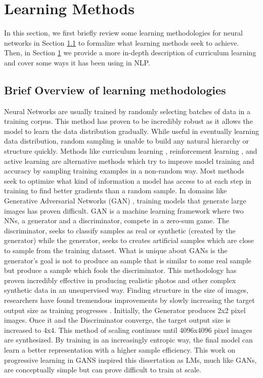 \section{Learning Methods}
\label{chap:prior:sec:cl}
In this section, we first briefly review some learning methodologies for neural networks in Section \ref{chap:prior:sec:cl:overview} to formalize what learning methods seek to achieve. Then, in Section \ref{chap:prior:sec:cl} we provide a more in-depth description of curriculum learning and cover some ways it has been using in NLP. 
\subsection{Brief Overview of learning methodologies}
\label{chap:prior:sec:cl:overview}
Neural Networks are usually trained by randomly selecting batches of data in a training corpus. This method has proven to be incredibly robust as it allows the model to learn the data distribution gradually. While useful in eventually learning data distribution, random sampling is unable to build any natural hierarchy or structure quickly. Methods like curriculum learning \cite{Bengio2009CurriculumL}, reinforcement learning \cite{Sutton1998ReinforcementLA}, and active learning \cite{Cohn1994ActiveLW} are alternative methods which try to improve model training and accuracy by sampling training examples in a non-random way. Most methods seek to optimize what kind of information a model has access to at each step in training to find better gradients than a random sample. In domains like Generative Adversarial Networks (GAN) \cite{Goodfellow2014GenerativeAN}, training models that generate large images has proven difficult. GAN is a machine learning framework where two NNs, a generator and a discriminator, compete in a zero-sum game. The discriminator, seeks to classify samples as real or synthetic (created by the generator) while the generator, seeks to creates artificial samples which are close to sample from the training dataset. What is unique about GANs is the generator's goal is not to produce an sample that is similar to some real sample but produce a sample which fools the discriminator. This methodology has proven incredibly effective in producing realistic photos and other complex synthetic data in an unsupervised way. Finding structure in the size of images, researchers have found tremendous improvements by slowly increasing the target output size as training progresses \cite{Karras2017ProgressiveGO}. Initially, the Generator produces 2x2 pixel images. Once it and the Discriminator converge, the target output size is increased to 4x4. This method of scaling continues until 4096x4096 pixel images are synthesized. By training in an increasingly entropic way, the final model can learn a better representation with a higher sample efficiency. This work on progressive learning in GANS inspired this dissertation as LMs, much like GANs, are conceptually simple but can prove difficult to train at scale. 

